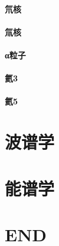 \documentclass[UTF8]{../06-Physics}
\begin{document}
        \subsubsection{氘核}
        \subsubsection{氚核}
        \subsubsection{α粒子}
        \subsubsection{氦3}
        \subsubsection{氦5}



\chapter{波谱学}
\chapter{能谱学}

\chapter{END}
\end{document}
